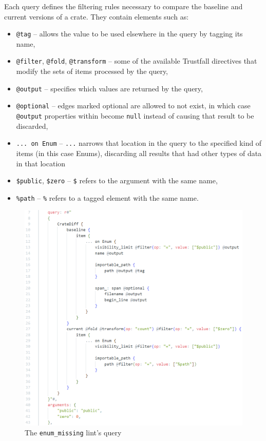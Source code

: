 \documentclass[licencjacka,en]{pracamgr}
\begin{document}
Each query defines the filtering rules necessary to compare the baseline and current versions of
a crate. They contain elements such as:
\begin{itemize}
	\item \texttt{@tag} -- allows the value to be used elsewhere in the query by
		tagging its name,
	\item \texttt{@filter}, \texttt{@fold}, \texttt{@transform} -- some of the available Trustfall
		directives that modify the sets of items processed by the query,
	\item \texttt{@output} -- specifies which values are returned by the query,
	\item \texttt{@optional} -- edges marked optional are allowed to not exist, in which case
		\texttt{@output} properties within become \texttt{null} instead of causing that result
		to be discarded,
	\item \texttt{... on Enum} -- \texttt{...} narrows that location in the query to the specified
		kind of items (in this case Enums), discarding all results that had other types of data
		in that location
	\item \texttt{\$public}, \texttt{\$zero} -- \texttt{\$} refers to the argument with the same
		name,
	\item \texttt{\%path} -- \texttt{\%} refers to a tagged element with the same name.
\end{itemize}

\begin{figure}[h]
	\centering
	\includegraphics[width=0.975\linewidth]{lint-query-example.png}
	\caption{The \texttt{enum\_missing} lint's query}
	\label{fig:enum_missing_lint_query}
\end{figure}
\end{document}
